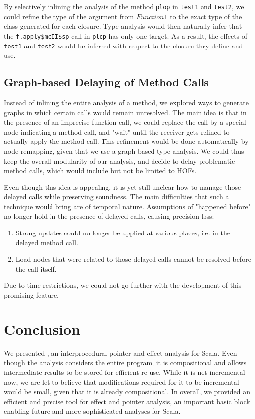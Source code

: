 By selectively inlining the analysis of the method \lstinline{plop} in
\lstinline{test1} and \lstinline{test2}, we could refine the type of the
argument from $Function1$ to the exact type of the class generated for each
closure. Type analysis would then naturally infer that the
\lstinline{f.apply$mcII$sp} call in \lstinline{plop} has only one target.  As a
result, the effects of \lstinline{test1} and \lstinline{test2} would be
inferred with respect to the closure they define and use.

\subsection{Graph-based Delaying of Method Calls}
Instead of inlining the entire analysis of a method, we explored ways to
generate graphs in which certain calls would remain unresolved. The main idea
is that in the presence of an imprecise function call, we could replace the
call by a special node indicating a method call, and "wait" until the receiver
gets refined to actually apply the method call. This refinement would be done
automatically by node remapping, given that we use a graph-based type analysis.
We could thus keep the overall modularity of our analysis, and decide to delay
problematic method calls, which would include but not be limited to HOFs.

Even though this idea is appealing, it is yet still unclear how to manage those
delayed calls while preserving soundness. The main difficulties that such a
technique would bring are of temporal nature. Assumptions of "happened before"
no longer hold in the presence of delayed calls, causing precision loss:
\begin{enumerate}
    \item Strong updates could no longer be applied at various places, i.e. in
    the delayed method call.
    \item Load nodes that were related to those delayed calls cannot be resolved
    before the call itself.
\end{enumerate}
Due to time restrictions, we could not go further with the development of this
promising feature.


\section{Conclusion}
We presented \insane, an interprocedural pointer and effect analysis for Scala.
Even though the analysis considers the entire program, it is compositional and
allows intermediate results to be stored for efficient re-use. While it
is not incremental now, we are let to believe that modifications required for
it to be incremental would be small, given that it is already compositional. In
overall, we provided an efficient and precise tool for effect and pointer
analysis, an important basic block enabling future and more sophisticated
analyses for Scala.
